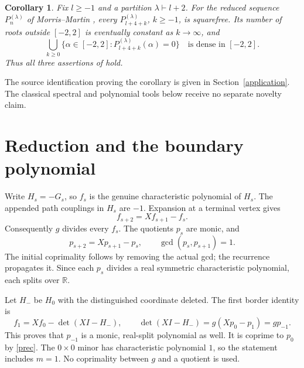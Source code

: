 \documentclass[11pt]{article}
\newtheorem{corollary}[theorem]{Corollary}
\newcommand{\R}{\mathbb R}
\begin{document}
\begin{corollary}\label{source}
Fix $l\ge-1$ and a partition $\lambda\vdash l+2$. For the reduced sequence
$P_n^{(\lambda)}$ of Morris--Martin \cite[Theorem~3.19]{MM}, every
$P_{l+4+k}^{(\lambda)}$, $k\ge-1$, is squarefree. Its number of roots outside
$[-2,2]$ is eventually constant as $k\to\infty$, and
\[
 \bigcup_{k\ge0}\{\alpha\in[-2,2]:P_{l+4+k}^{(\lambda)}(\alpha)=0\}
 \quad\text{is dense in }[-2,2].
\]
Thus all three assertions of \cite[Conjecture~4.5.1]{MM} hold.
\end{corollary}
The source identification proving the corollary is given in Section~\ref{application}.
The classical spectral and polynomial tools below receive no separate novelty claim.

\section{Reduction and the boundary polynomial}
Write $H_s=-G_s$, so $f_s$ is the genuine characteristic polynomial of $H_s$.
The appended path couplings in $H_s$ are $-1$. Expansion at a terminal
vertex gives
\begin{equation}\label{rec}
 f_{s+2}=Xf_{s+1}-f_s.
\end{equation}
Consequently $g$ divides every $f_s$. The quotients $p_s$ are monic, and
\begin{equation}\label{prec}
 p_{s+2}=Xp_{s+1}-p_s,\qquad
 \gcd(p_s,p_{s+1})=1.
\end{equation}
The initial coprimality follows by removing the actual gcd; the recurrence
propagates it. Since each $p_s$ divides a real symmetric characteristic
polynomial, each splits over $\R$.

Let $H_-$ be $H_0$ with the distinguished coordinate deleted. The first
border identity is
\begin{equation}\label{boundary}
 f_1=Xf_0-\det(XI-H_-),\qquad
 \det(XI-H_-)=g(Xp_0-p_1)=gp_{-1}.
\end{equation}
This proves that $p_{-1}$ is a monic, real-split polynomial as well.
It is coprime to $p_0$ by \eqref{prec}. The $0\times0$ minor has
characteristic polynomial $1$, so the statement includes $m=1$.
No coprimality between $g$ and a quotient is used.
\end{document}
